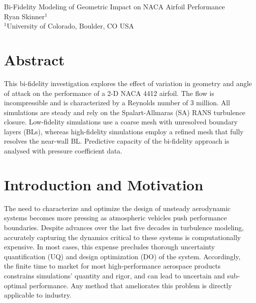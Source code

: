 \documentclass[11pt]{article}
\begin{document}
{
	\fancyhf[CH]{}
	\fancyhf[RH]{\thepage}
	\fancyhf[LF]{}
	\fancyhf[CF]{}
	\fancyhf[RF]{}
}

{
	\fancyhf[CH]{}
	\fancyhf[LF]{}
	\fancyhf[CF]{}
	\fancyhf[RF]{}
}

\pagestyle{allpages}
\thispagestyle{firstpage}
\renewcommand{\sectionmark}[1]{ \markright{#1}{} }

\vspace*{0in}
\begin{center}
\Large
Bi-Fidelity Modeling of Geometric Impact on NACA Airfoil Performance
\\[1ex]
\large
Ryan Skinner$^1$
\\[1ex]
\normalsize
$^1$University of Colorado, Boulder, CO USA
\end{center}

\section*{Abstract}
This bi-fidelity investigation explores the effect of variation in geometry and angle of attack on the performance of a 2-D NACA 4412 airfoil. The flow is incompressible and is characterized by a Reynolds number of 3 million. All simulations are steady and rely on the Spalart-Allmaras (SA) RANS turbulence closure. Low-fidelity simulations use a coarse mesh with unresolved boundary layers (BLs), whereas high-fidelity simulations employ a refined mesh that fully resolves the near-wall BL. Predictive capacity of the bi-fidelity approach is analysed with pressure coefficient data.

\section{Introduction and Motivation}

The need to characterize and optimize the design of unsteady aerodynamic systems becomes more pressing as atmospheric vehicles push performance boundaries. Despite advances over the last five decades in turbulence modeling, accurately capturing the dynamics critical to these systems is computationally expensive. In most cases, this expense precludes thorough uncertainty quantification (UQ) and design optimization (DO) of the system. Accordingly, the finite time to market for most high-performance aerospace products constrains simulations' quantity and rigor, and can lead to uncertain and sub-optimal performance. Any method that ameliorates this problem is directly applicable to industry.
\end{document}
